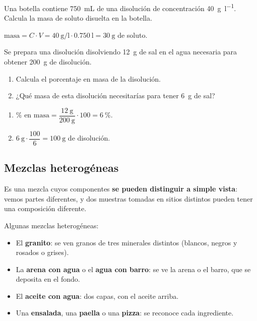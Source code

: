 \begin{exercise}
    Una botella contiene \qty{750}{\mL} de una disolución de concentración \qty{40}{\g\per\litre}. Calcula la masa de soluto disuelta en la botella.
    \begin{solu}
        \(\text{masa} = C \cdot V = \qty{40}{\g\per\litre} \cdot \qty{0.750}{\litre} = \qty{30}{\g}\) de soluto.
    \end{solu}
\end{exercise}

\begin{exercise}
    Se prepara una disolución disolviendo \qty{12}{\g} de sal en el agua necesaria para obtener \qty{200}{\g} de disolución.
    \begin{enumerate}[label=\letraminuscula]
        \item Calcula el porcentaje en masa de la disolución.
        \item ¿Qué masa de esta disolución necesitarías para tener \qty{6}{\g} de sal?
    \end{enumerate}
    \begin{solu}
        \begin{enumerate}[label=\alph*)]
            \item \(\% \text{ en masa} = \dfrac{\qty{12}{\g}}{\qty{200}{\g}} \cdot 100 = \qty{6}{\percent}\).
            \item \(\qty{6}{\g} \cdot \dfrac{100}{6} = \qty{100}{\g}\) de disolución.
        \end{enumerate}
    \end{solu}
\end{exercise}

\subsection{Mezclas heterogéneas}

\begin{definition}
    Es una mezcla cuyos componentes \textbf{se pueden distinguir a simple vista}: vemos partes diferentes, y dos muestras tomadas en sitios distintos pueden tener una composición diferente.
\end{definition}

\begin{example}
    Algunas mezclas heterogéneas:
    \begin{itemize}
        \item El \textbf{granito}: se ven granos de tres minerales distintos (blancos, negros y rosados o grises).
        \item La \textbf{arena con agua} o el \textbf{agua con barro}: se ve la arena o el barro, que se deposita en el fondo.
        \item El \textbf{aceite con agua}: dos capas, con el aceite arriba.
        \item Una \textbf{ensalada}, una \textbf{paella} o una \textbf{pizza}: se reconoce cada ingrediente.
    \end{itemize}
\end{example}

